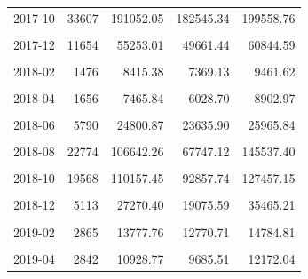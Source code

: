 \begin{longtable}[t]{crrrr}
2017-10 & 33607 & 191052.05 & 182545.34 & 199558.76\\
\cellcolor{gray!10}{2017-11} & \cellcolor{gray!10}{19334} & \cellcolor{gray!10}{92391.94} & \cellcolor{gray!10}{82715.58} & \cellcolor{gray!10}{102068.30}\\
2017-12 & 11654 & 55253.01 & 49661.44 & 60844.59\\
\cellcolor{gray!10}{2018-01} & \cellcolor{gray!10}{2553} & \cellcolor{gray!10}{14018.46} & \cellcolor{gray!10}{11253.67} & \cellcolor{gray!10}{16783.26}\\
2018-02 & 1476 & 8415.38 & 7369.13 & 9461.62\\
\cellcolor{gray!10}{2018-03} & \cellcolor{gray!10}{2657} & \cellcolor{gray!10}{10991.29} & \cellcolor{gray!10}{9854.35} & \cellcolor{gray!10}{12128.23}\\
2018-04 & 1656 & 7465.84 & 6028.70 & 8902.97\\
\cellcolor{gray!10}{2018-05} & \cellcolor{gray!10}{3366} & \cellcolor{gray!10}{14034.74} & \cellcolor{gray!10}{12887.37} & \cellcolor{gray!10}{15182.10}\\
2018-06 & 5790 & 24800.87 & 23635.90 & 25965.84\\
\cellcolor{gray!10}{2018-07} & \cellcolor{gray!10}{12652} & \cellcolor{gray!10}{54142.79} & \cellcolor{gray!10}{44704.18} & \cellcolor{gray!10}{63581.40}\\
2018-08 & 22774 & 106642.26 & 67747.12 & 145537.40\\
\cellcolor{gray!10}{2018-09} & \cellcolor{gray!10}{42251} & \cellcolor{gray!10}{221177.00} & \cellcolor{gray!10}{204735.06} & \cellcolor{gray!10}{237618.93}\\
2018-10 & 19568 & 110157.45 & 92857.74 & 127457.15\\
\cellcolor{gray!10}{2018-11} & \cellcolor{gray!10}{13014} & \cellcolor{gray!10}{63852.04} & \cellcolor{gray!10}{49229.23} & \cellcolor{gray!10}{78474.84}\\
2018-12 & 5113 & 27270.40 & 19075.59 & 35465.21\\
\cellcolor{gray!10}{2019-01} & \cellcolor{gray!10}{4030} & \cellcolor{gray!10}{20946.13} & \cellcolor{gray!10}{18115.64} & \cellcolor{gray!10}{23776.62}\\
2019-02 & 2865 & 13777.76 & 12770.71 & 14784.81\\
\cellcolor{gray!10}{2019-03} & \cellcolor{gray!10}{5213} & \cellcolor{gray!10}{19562.21} & \cellcolor{gray!10}{17042.17} & \cellcolor{gray!10}{22082.24}\\
2019-04 & 2842 & 10928.77 & 9685.51 & 12172.04\\

\end{longtable}
